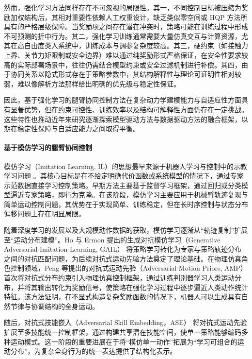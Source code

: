 然而，强化学习方法同样存在不可忽视的局限性。其一，不同控制目标被压缩为奖励加权结构后，其相对重要性依赖人工权重设计，缺乏类似零空间或 HQP 方法所具有的严格层级保障。当奖励项之间存在潜在冲突时，策略可能在训练过程中形成不可预测的折中行为。其二，强化学习训练通常需要大量仿真交互与计算资源，尤其在高自由度类人系统中，训练成本与调参复杂度较高。其三，硬约束（如接触力上界、关节力矩限制或安全边界）难以通过纯奖励形式严格保证，在安全性要求较高的实际部署场景中，往往仍需结合模型约束或安全过滤机制进行补偿。其四，由于协同关系以隐式形式存在于策略参数中，其结构解释性与理论可证明性相对较弱，难以像解析方法那样给出明确的优先级与稳定性保证。

因此，基于强化学习的腿臂协同控制方法在复杂动力学建模能力与自适应性方面具有显著优势，但在约束可控性、训练效率以及结构可解释性方面仍存在一定挑战。这些特性也推动近年来研究逐渐探索模型驱动方法与数据驱动方法的融合框架，以期在稳定性保障与自适应能力之间取得平衡。





\paragraph{基于模仿学习的腿臂协同控制}

模仿学习（Imitation Learning, IL）的思想最早来源于机器人学习与控制中的示教学习问题 \cite{Argall2009LfD}。其核心目标是在不给定明确代价函数或系统模型的情况下，通过专家示范数据直接学习控制策略。早期方法主要基于监督学习框架，通过回归或分类模型逼近专家策略，即行为克隆\cite{Pomerleau1989ALVINN, Bain1995BC}。在该阶段，模仿学习主要应用于机械臂轨迹复现与简单运动控制问题，其优势在于实现简单、训练稳定，但在长时序控制与状态分布偏移问题上存在明显局限。

随着深度学习的发展以及大规模动作数据的获取，模仿学习逐渐从“轨迹复制”扩展至“运动分布建模”。Ho 与 Ermon 提出的生成对抗模仿学习（Generative Adversarial Imitation Learning, GAIL）\cite{Ho2016GAIL} 将策略学习转化为专家与策略轨迹分布之间的对抗匹配问题，为后续对抗式运动先验方法奠定了理论基础。在物理仿真角色控制领域，Peng 等提出的对抗式运动先验（Adversarial Motion Priors, AMP）\cite{AMP} 首次将对抗式分布约束引入物理仿真控制框架，通过训练判别器学习人类运动分布，并将其输出转化为奖励信号，使策略在强化学习过程中逐步逼近人类动作统计特征。该方法证明，在不显式构造复杂奖励函数的情况下，机器人可以生成具有自然节律与协调结构的全身运动。

随后，对抗式技能嵌入（Adversarial Skill Embedding，ASE）\cite{ASE} 将对抗式运动先验扩展至多技能统一控制框架，通过构建共享潜在技能空间，使单一策略能够编码多种运动模式。这一阶段的重要进展在于将“模仿单一动作”拓展为“学习可组合的运动分布”，为复杂全身行为的统一表达提供了结构化表示。


